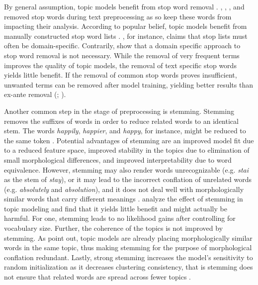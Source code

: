 \documentclass[11pt,a4paper,english,oneside]{book}
\numberwithin{equation}{chapter}
\begin{document}
By general assumption, topic models benefit from stop word removal \cite[p. 432]{SchofieldA.MagnussonM.&MimnoD..2017}. \cite{Blei.2003}, \cite{Chem.2007}, \cite{Steyvers(2007)}, and \cite{Hofmann.2001} removed stop words during text preprocessing as so keep these words from impacting their analysis. According to popular belief, topic models benefit from manually constructed stop word lists \cite[p. 432]{SchofieldA.MagnussonM.&MimnoD..2017}. \citet[p. 7]{Darling.2011}, for instance, claims that stop lists must often be domain-specific. Contrarily, \cite{SchofieldA.MagnussonM.&MimnoD..2017} show that a domain specific approach to stop word removal is not necessary. While the removal of very frequent terms improves the quality of topic models, the removal of text specific stop words yields little benefit. If the removal of common stop words proves insufficient, unwanted terms can be removed after model training, yielding better results than ex-ante removal (\citealt[p. 432]{SchofieldA.MagnussonM.&MimnoD..2017}; \citealt{Schofield.2017}).

Another common step in the stage of preprocessing is stemming. Stemming removes the suffixes of words in order to reduce related words to an identical stem. The words \textit{happily}, \textit{happier}, and \textit{happy}, for instance, might be reduced to the same token \cite[p. 287]{Schofield.2016}. Potential advantages of stemming are an improved model fit due to a reduced feature space, improved stability in the topics due to elimination of small morphological differences, and improved interpretability due to word equivalence.  However, stemming may also render words unrecognizable (e.g. \textit{stai} as the stem of \textit{stay}), or it may lead to the incorrect conflation of unrelated words (e.g. \textit{absolutely} and \textit{absolution}), and it does not deal well with morphologically similar words that carry different meanings \cite[p. 287]{Schofield.2016}. \cite{Schofield.2016} analyze the effect of stemming in topic modeling and find that it yields little benefit and might actually be harmful. For one, stemming leads to no likelihood gains after controlling for vocabulary size. Further, the coherence of the topics is not improved by stemming. As \citet{Schofield.2017} point out, topic models are already placing morphologically similar words in the same topic, thus making stemming for the purpose of morphological conflation redundant. Lastly, strong stemming increases the model's sensitivity to random initialization as it decreases clustering consistency, that is stemming does not ensure that related words are spread across fewer topics \cite[p. 293--295]{Schofield.2016}.  
\end{document}
